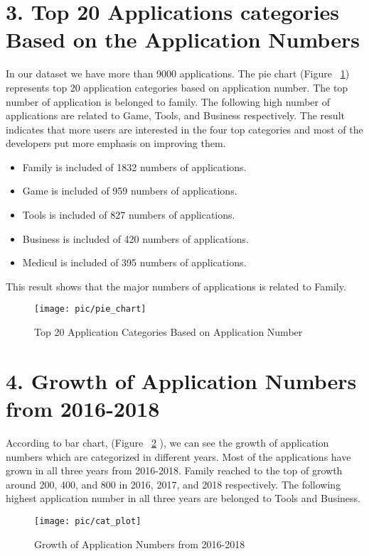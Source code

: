 \documentclass{article}
\begin{document}
\section*{3. Top 20 Applications categories Based on the Application Numbers}
In our dataset we have more than 9000 applications. The pie chart (Figure ~\ref{fig:1}) represents top 20 application categories based on application number. The top number of application is belonged to family. The following high number of applications are related to Game, Tools, and Business respectively. The result indicates that more users are interested in the four top categories and most of the developers put more emphasis on improving them.
\begin{itemize}
\item
  Family is included of 1832  numbers of applications.
\item
  Game is included of 959  numbers of applications.
  \item
  Tools is included of 827  numbers of applications.
\item
  Business is included of 420  numbers of applications.
\item
  Medicul is included of 395  numbers of applications.
\end{itemize}

This result shows that the major numbers of applications is related to Family.
\begin{figure}
\centering
\texttt{[image: pic/pie\_chart]}
\caption{Top 20 Application Categories Based on Application Number}
\label{fig:1}
\end{figure}

\section*{4. Growth of Application Numbers from 2016-2018}
According to bar chart, (Figure ~\ref{fig:2} ), we can see the growth of application numbers which are categorized in different years. Most of the applications have grown in all three years from 2016-2018.
Family reached to the top of growth around 200, 400, and 800 in 2016, 2017, and 2018 respectively. The following highest application number in all three years are belonged to Tools and Business.

\begin{figure}
\centering
\texttt{[image: pic/cat\_plot]}
\caption{Growth of Application Numbers from 2016-2018} 
\label{fig:2}
\end{figure}	
\end{document}

